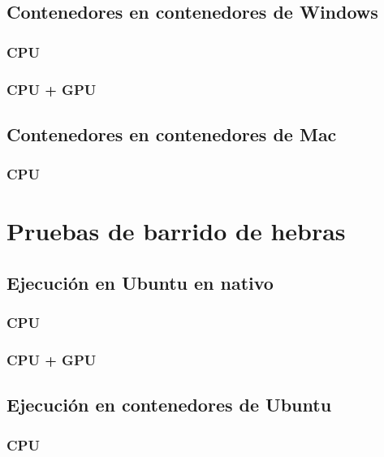 
\subsection{Contenedores en contenedores de Windows}
\subsubsection{CPU}

\subsubsection{CPU + GPU}

\subsection{Contenedores en contenedores de Mac}
\subsubsection{CPU}

\section{Pruebas de barrido de hebras}
\subsection{Ejecución en Ubuntu en nativo}
\subsubsection{CPU}

\subsubsection{CPU + GPU}

\subsection{Ejecución en contenedores de Ubuntu}
\subsubsection{CPU}

